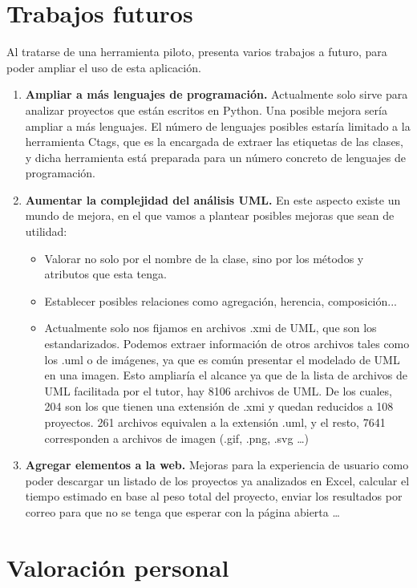 \documentclass[a4paper, 12pt]{book}
\begin{document}
\section{Trabajos futuros}
\label{sec:trabajos_futuros}

Al tratarse de una herramienta piloto, presenta varios trabajos a futuro, para poder ampliar el uso de esta aplicación.

\begin{enumerate}
  \item \textbf{Ampliar a más lenguajes de programación.} Actualmente solo sirve para analizar proyectos que
  están escritos en Python. Una posible mejora sería ampliar a más lenguajes. El número de lenguajes posibles
  estaría limitado a la herramienta Ctags, que es la encargada de extraer las etiquetas de las clases, y dicha herramienta
  está preparada para un número concreto de lenguajes de programación.
  \item \textbf{Aumentar la complejidad del análisis UML.} En este aspecto existe un mundo de mejora, en el que vamos a plantear posibles
  mejoras que sean de utilidad:
  \begin{itemize}
    \item Valorar no solo por el nombre de la clase, sino por los métodos y atributos que esta tenga.
    \item Establecer posibles relaciones como agregación, herencia, composición...
    \item Actualmente solo nos fijamos en archivos .xmi de UML, que son los estandarizados. Podemos extraer información de otros
    archivos tales como los .uml o de imágenes, ya que es común presentar el modelado de UML en una imagen.
    Esto ampliaría el alcance ya que de la lista de archivos de UML facilitada por el tutor, hay 8106 archivos de UML. De los cuales,
    204 son los que tienen una extensión de .xmi y quedan reducidos a 108 proyectos.
    261 archivos equivalen a la extensión .uml, y el resto, 7641 corresponden a archivos de imagen (.gif, .png, .svg \ldots )
  \end{itemize}
  \item \textbf{Agregar elementos a la web.} Mejoras para la experiencia de usuario como poder descargar un listado de los proyectos
  ya analizados en Excel, calcular el tiempo estimado en base al peso total del proyecto, enviar los resultados por correo para que no se
  tenga que esperar con la página abierta \ldots
\end{enumerate}


\section{Valoración personal}
\label{sec:valoracion}
\end{document}
